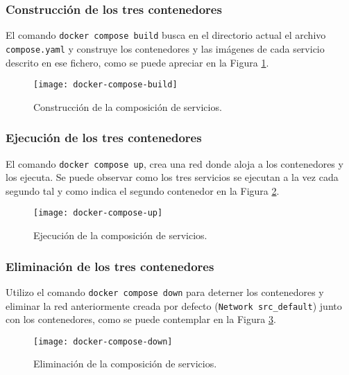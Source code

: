 \subsubsection{Construcción de los tres contenedores}
\par El comando \texttt{docker compose build} busca en el directorio actual el archivo
\texttt{compose.yaml} y construye los contenedores y las imágenes de cada servicio descrito 
en ese fichero, como se puede apreciar en la Figura \ref{fig:docker-compose-build}.
\begin{figure}[H]
    \texttt{[image: docker-compose-build]}
    \centering
    \caption{Construcción de la composición de servicios.}
    \label{fig:docker-compose-build}
 \end{figure}

\subsubsection{Ejecución de los tres contenedores}
\par El comando \texttt{docker compose up}, crea una red donde aloja a los contenedores y 
los ejecuta. Se puede observar como los tres servicios se ejecutan 
a la vez cada segundo tal y como indica el segundo contenedor en la Figura \ref{fig:docker-compose-up}.

\begin{figure}[H]
   \texttt{[image: docker-compose-up]}
   \centering
   \caption{Ejecución de la composición de servicios.}
   \label{fig:docker-compose-up}
\end{figure}


\subsubsection{Eliminación de los tres contenedores}
\par Utilizo el comando \texttt{docker compose down} para deterner los contenedores y eliminar la red anteriormente
creada por defecto (\texttt{Network src\_default}) junto con los contenedores, como se puede contemplar en la 
Figura \ref{fig:docker-compose-down}.
 \begin{figure}[H]
	\texttt{[image: docker-compose-down]}
	\centering
	\caption{Eliminación de la composición de servicios.}
    \label{fig:docker-compose-down}
\end{figure}